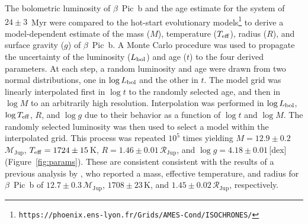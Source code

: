 \documentclass[twocolumn]{aastex6}
\newcommand{\rjup}{$\mathcal{R}_\mathrm{Jup}$}
\newcommand{\mjup}{$\mathcal{M}_\mathrm{Jup}$}
\begin{document}
The bolometric luminosity of $\beta$~Pic~b and the age estimate for the system of $24\pm3$~Myr \citep{Bell2015} were compared to the \citet{2003A&A...402..701B} hot-start evolutionary models\footnote{{\tt https://phoenix.ens-lyon.fr/Grids/AMES-Cond/ISOCHRONES/}} to derive a model-dependent estimate of the mass ($M$), temperature ($T_{\rm eff}$), radius ($R$), and surface gravity ($g$) of $\beta$~Pic~b. A Monte Carlo procedure was used to propagate the uncertainty of the luminosity ($L_{\rm bol}$) and age ($t$) to the four derived parameters. At each step, a random luminosity and age were drawn from two normal distributions, one in $\log L_{\rm bol}$ and the other in $t$. The model grid was linearly interpolated first in $\log t$ to the randomly selected age, and then in $\log M$ to an arbitrarily high resolution. Interpolation was performed in $\log L_{\rm bol}$, $\log T_{\rm eff}$, $R$, and $\log g$ due to their behavior as a function of $\log t$ and $\log M$. The randomly selected luminosity was then used to select a model within the interpolated grid. This process was repeated $10^5$ times yielding $M=12.9\pm0.2$\,\mjup, $T_{\rm eff} = 1724\pm15$\,K, $R = 1.46\pm0.01$\,\rjup, and $\log g = 4.18\pm0.01$\,[dex] (Figure~\ref{fig:params}). These are consistent consistent with the results of a previous analysis by \citet{Morzinski2015}, who reported a mass, effective temperature, and radius for $\beta$~Pic~b of $12.7\pm0.3$\,\mjup, $1708\pm23$\,K, and $1.45\pm0.02$\,\rjup, respectively.
\end{document}
